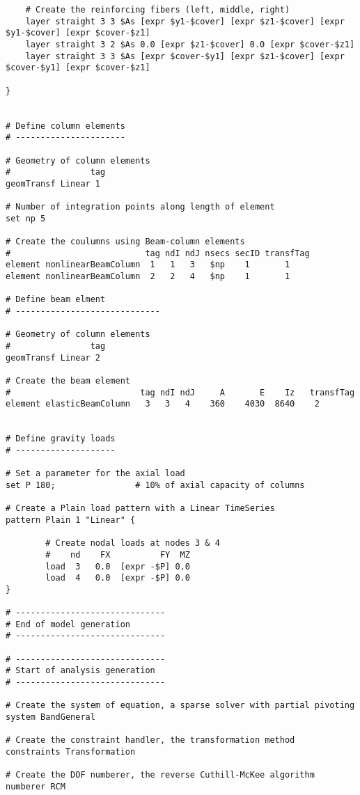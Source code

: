 \documentclass[12pt]{article}
\begin{document}
{\begin{verbatim}
    # Create the reinforcing fibers (left, middle, right)
    layer straight 3 3 $As [expr $y1-$cover] [expr $z1-$cover] [expr $y1-$cover] [expr $cover-$z1]
    layer straight 3 2 $As 0.0 [expr $z1-$cover] 0.0 [expr $cover-$z1]
    layer straight 3 3 $As [expr $cover-$y1] [expr $z1-$cover] [expr $cover-$y1] [expr $cover-$z1]

}    


# Define column elements
# ----------------------

# Geometry of column elements
#                tag 
geomTransf Linear 1  

# Number of integration points along length of element
set np 5

# Create the coulumns using Beam-column elements
#                           tag ndI ndJ nsecs secID transfTag
element nonlinearBeamColumn  1   1   3   $np    1       1 
element nonlinearBeamColumn  2   2   4   $np    1       1 

# Define beam elment
# -----------------------------

# Geometry of column elements
#                tag 
geomTransf Linear 2  

# Create the beam element
#                          tag ndI ndJ     A       E    Iz   transfTag
element elasticBeamColumn   3   3   4    360    4030  8640    2


# Define gravity loads
# --------------------

# Set a parameter for the axial load
set P 180;                # 10% of axial capacity of columns

# Create a Plain load pattern with a Linear TimeSeries
pattern Plain 1 "Linear" {

        # Create nodal loads at nodes 3 & 4
        #    nd    FX          FY  MZ 
        load  3   0.0  [expr -$P] 0.0
        load  4   0.0  [expr -$P] 0.0
}

# ------------------------------
# End of model generation
# ------------------------------

# ------------------------------
# Start of analysis generation
# ------------------------------

# Create the system of equation, a sparse solver with partial pivoting
system BandGeneral

# Create the constraint handler, the transformation method
constraints Transformation

# Create the DOF numberer, the reverse Cuthill-McKee algorithm
numberer RCM


\end{verbatim}}
\end{document}
